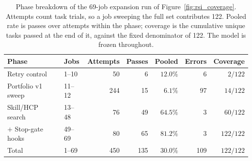 \begin{table}[t]
\centering
\caption{Phase breakdown of the 69-job expansion run of Figure~\ref{fig:rsi_coverage}. Attempts count task trials, so a job sweeping the full set contributes 122. Pooled rate is passes over attempts within the phase; coverage is the cumulative unique tasks passed at the end of it, against the fixed denominator of 122. The model is frozen throughout.}
\label{tab:rsi_coverage}
\footnotesize
\setlength{\tabcolsep}{5pt}
\begin{tabular}{llrrrrr}
\toprule
Phase & Jobs & Attempts & Passes & Pooled & Errors & Coverage \\
\midrule
Retry control        & 1--10  & 50  & 6  & $12.0\%$ & 6  & $2/122$ \\
Portfolio v1 sweep   & 11--12 & 244 & 15 & $6.1\%$  & 97 & $14/122$ \\
Skill/HCP search     & 13--48 & 76  & 49 & $64.5\%$ & 3  & $60/122$ \\
$+$ Stop-gate hooks  & 49--69 & 80  & 65 & $81.2\%$ & 3  & $122/122$ \\
\midrule
Total                & 1--69  & 450 & 135 & $30.0\%$ & 109 & $122/122$ \\
\bottomrule
\end{tabular}
\end{table}
